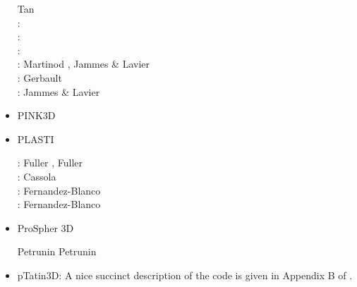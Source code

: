 \begin{itemize}
\begin{scriptsize}
                    Tan \etal \cite{talv12}\\
\twothousandthirteen: \cite{wabd13}\cite{frbm13}\cite{tibb13}\\
\twothousandfourteen: \cite{frba14}\cite{gagb14}\cite{bufa14}\cite{bufy14b}\\
\twothousandfifteen: \cite{wulc15}\cite{gebw15}\cite{svlh15}\\
\twothousandsixteen: Martinod \etal \cite{marl16}, Jammes \& Lavier \cite{jala16}\\
\twothousandeighteen: Gerbault \etal \cite{gesr18}\\
\twothousandnineteen: Jammes \& Lavier \cite{jala19}
\end{scriptsize}

\item PINK3D

{\small
\noindent
\cite{vosc15}
}


\item PLASTI

\begin{scriptsize}
\twothousandsix: Fuller \etal \cite{fuwb06}, Fuller \etal \cite{fuwf06}\\
\twothousandthirteen: Cassola \cite{cass13}\\
\twothousandtwenty: Fernandez-Blanco \etal \cite{femb20}\\
\twothousandtwentyone: Fernandez-Blanco \etal \cite{femc21}
\end{scriptsize}

\item ProSpher 3D

Petrunin \etal \cite{pekr13} 
Petrunin \etal \cite{peke20}


\item pTatin3D: A nice succinct description of the code is given in Appendix B of \cite{lemh17}. 


\end{itemize}
